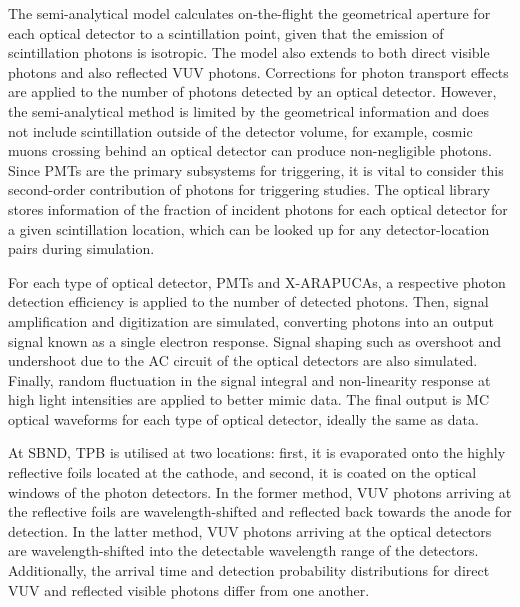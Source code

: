 The semi-analytical model calculates on-the-flight the geometrical aperture for each optical detector to a scintillation point, given that the emission of scintillation photons is isotropic.
The model also extends to both direct visible photons and also reflected VUV photons. 
Corrections for photon transport effects are applied to the number of photons detected by an optical detector.
However, the semi-analytical method is limited by the geometrical information and does not include scintillation outside of the detector volume, for example, cosmic muons crossing behind an optical detector can produce non-negligible photons.
Since PMTs are the primary subsystems for triggering, it is vital to consider this second-order contribution of photons for triggering studies.
The optical library stores information of the fraction of incident photons for each optical detector for a given scintillation location, which can be looked up for any detector-location pairs during simulation. 

For each type of optical detector, PMTs and X-ARAPUCAs, a respective photon detection efficiency is applied to the number of detected photons.
Then, signal amplification and digitization are simulated, converting photons into an output signal known as a single electron response.
Signal shaping such as overshoot and undershoot due to the AC circuit of the optical detectors are also simulated.
Finally, random fluctuation in the signal integral and non-linearity response at high light intensities are applied to better mimic data.
The final output is MC optical waveforms for each type of optical detector, ideally the same as data. 



At SBND, TPB is utilised at two locations: first, it is evaporated onto the highly reflective foils located at the cathode, and second, it is coated on the optical windows of the photon detectors. 
In the former method, VUV photons arriving at the reflective foils are wavelength-shifted and reflected back towards the anode for detection.
In the latter method,  VUV photons arriving at the optical detectors are wavelength-shifted into the detectable wavelength range of the detectors.
Additionally, the arrival time and detection probability distributions for direct VUV and reflected visible photons differ from one another.

